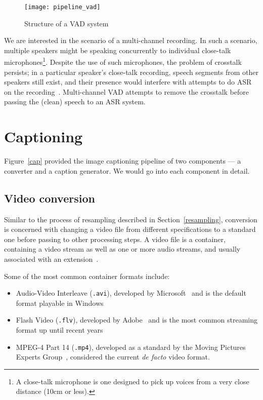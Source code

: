 \begin{figure}[h]
\begin{center}
    \texttt{[image: pipeline\_vad]}
    \caption{Structure of a VAD system}\label{vad}
\end{center}
\end{figure}

We are interested in the scenario of a multi-channel recording. In such a
scenario, multiple speakers might be speaking concurrently to individual
close-talk microphones\footnote{A close-talk microphone is one designed to pick
up voices from a very close distance (10cm or less).}. Despite the use of such
microphones, the problem of crosstalk persists; in a particular speaker's
close-talk recording, speech segments from other speakers still exist, and
their presence would interfere with attempts to do ASR on the
recording~\cite{vad-mc}. Multi-channel VAD attempts
to remove the crosstalk before passing the (clean) speech to an ASR system.

\section{Captioning}

Figure~\ref{cap} provided the image captioning pipeline of two components ---
a converter and a caption generator. We would go into each component in detail.

\subsection{Video conversion}

Similar to the process of resampling described in Section~\ref{resampling},
conversion is concerned with changing a video file from different specifications
to a standard one before passing to other processing steps. A video file
is a container, containing a video stream as well as one or more audio
streams, and usually associated with an extension~\cite{vid}.

Some of the most common container formats include:

\begin{itemize}
    \item Audio-Video Interleave (\texttt{.avi}), developed by
    Microsoft~\cite{avi} and is the default format playable in Windows
    \item Flash Video (\texttt{.flv}), developed by Adobe~\cite{flv} and is
    the most common streaming format up until recent years
    \item MPEG-4 Part 14 (\texttt{.mp4}), developed as a standard by the
    Moving Pictures Experts Group~\cite{mp4}, considered the current
    \textit{de facto} video format.
\end{itemize}

